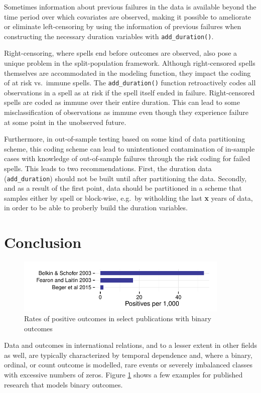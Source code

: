 \documentclass[]{article}
\begin{document}
Sometimes information about previous failures in the data is available
beyond the time period over which covariates are observed, making it
possible to ameliorate or eliminate left-censoring by using the
information of previous failures when constructing the necessary
duration variables with \texttt{add\_duration()}.

Right-censoring, where spells end before outcomes are observed, also
pose a unique problem in the split-population framework. Although
right-censored spells themselves are accommodated in the modeling
function, they impact the coding of at risk vs.~immune spells. The
\texttt{add\_duration()} function retroactively codes all observations
in a spell as at risk if the spell itself ended in failure.
Right-censored spells are coded as immune over their entire duration.
This can lead to some misclassification of observations as immune even
though they experience failure at some point in the unobserved future.

Furthermore, in out-of-sample testing based on some kind of data
partitioning scheme, this coding scheme can lead to unintentioned
contamination of in-sample cases with knowledge of out-of-sample
failures through the risk coding for failed spells. This leads to two
recommendations. First, the duration data (\texttt{add\_duration})
should not be built until after partitioning the data. Secondly, and as
a result of the first point, data should be partitioned in a scheme that
samples either by spell or block-wise, e.g.~by witholding the last
\textbf{x} years of data, in order to be able to proberly build the
duration variables.

\section{Conclusion}\label{conclusion}

\begin{figure}[htbp!]
\centering
\includegraphics[width = 4in]{graphics/rates.pdf}
\caption{Rates of positive outcomes in select publications with binary outcomes}
\label{rates}
\end{figure}

Data and outcomes in international relations, and to a lesser extent in
other fields as well, are typically characterized by temporal dependence
and, where a binary, ordinal, or count outcome is modelled, rare events
or severely imbalanced classes with excessive numbers of zeros. Figure
\ref{rates} shows a few examples for published research that models
binary outcomes.
\end{document}
